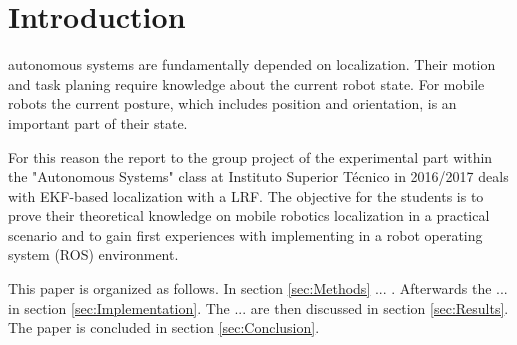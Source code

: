 \section{Introduction}
\label{sec:Introduction}
% 
% 
% 
% 
 autonomous systems are fundamentally depended on localization. Their motion and task planing require knowledge about the current robot state. For mobile robots the current posture, which includes position and orientation, is an important part of their state. 

For this reason the report to the group project of the experimental part within the "Autonomous Systems" class at Instituto Superior Técnico in 2016/2017 deals with EKF-based localization with a LRF. The objective for the students is to prove their theoretical knowledge on mobile robotics localization in a practical scenario and to gain first experiences with implementing in a robot operating system (ROS) environment. 

This paper is organized as follows. In section \ref{sec:Methods} ... . Afterwards the ... in section \ref{sec:Implementation}. The ... are then discussed in section \ref{sec:Results}. The paper is concluded in section \ref{sec:Conclusion}.